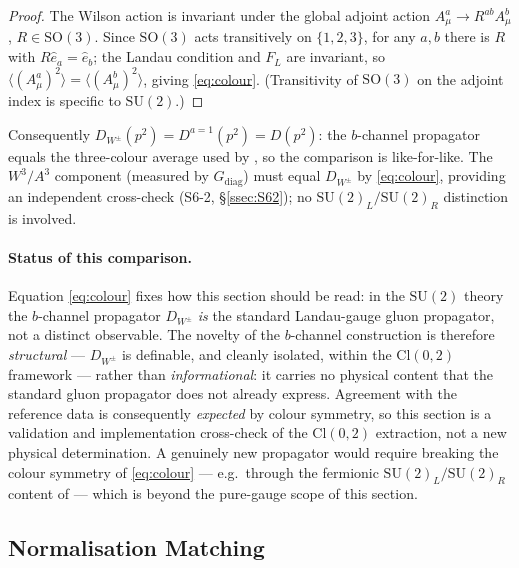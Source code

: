 \documentclass[11pt,a4paper]{article}
\theoremstyle{plain}
\theoremstyle{definition}
\theoremstyle{remark}
\newcommand{\Cl}{\mathrm{Cl}}
\newcommand{\SU}{\mathrm{SU}}
\newcommand{\SO}{\mathrm{SO}}
\newcommand{\Gdiag}{G_{\mathrm{diag}}}
\newcommand{\DW}{D_{W^{\pm}}}
\newcommand{\FL}{F_{L}}
\begin{document}
\begin{proof}
The Wilson action is invariant under the global adjoint action
$A^a_\mu\to R^{ab}A^b_\mu$, $R\in\SO(3)$. Since $\SO(3)$ acts
transitively on $\{1,2,3\}$, for any $a,b$ there is $R$ with
$R\hat e_a=\hat e_b$; the Landau condition and $\FL$ are invariant, so
$\langle(A^a_\mu)^2\rangle=\langle(A^b_\mu)^2\rangle$, giving
\eqref{eq:colour}. (Transitivity of $\SO(3)$ on the adjoint index is
specific to $\SU(2)$.)
\end{proof}

\noindent
Consequently $\DW(p^2)=D^{a=1}(p^2)=D(p^2)$: the $b$-channel propagator
equals the three-colour average used by \cite{CM}, so the comparison is
like-for-like. The $W^3/A^3$ component (measured by $\Gdiag$) must equal
$\DW$ by \eqref{eq:colour}, providing an independent cross-check
(S6-2, \S\ref{ssec:S62}); no $\SU(2)_L/\SU(2)_R$ distinction is involved.

\paragraph{Status of this comparison.}
Equation \eqref{eq:colour} fixes how this section should be read: in the
$\SU(2)$ theory the $b$-channel propagator $\DW$ \emph{is} the standard
Landau-gauge gluon propagator, not a distinct observable. The novelty of
the $b$-channel construction is therefore \emph{structural} --- $\DW$ is
definable, and cleanly isolated, within the $\Cl(0,2)$ framework --- rather
than \emph{informational}: it carries no physical content that the standard
gluon propagator does not already express. Agreement with the reference
data is consequently \emph{expected} by colour symmetry, so this section is
a validation and implementation cross-check of the $\Cl(0,2)$ extraction,
not a new physical determination. A genuinely new propagator would require
breaking the colour symmetry of \eqref{eq:colour} --- e.g.\ through the
fermionic $\SU(2)_L/\SU(2)_R$ content of  --- which is
beyond the pure-gauge scope of this section.

\subsection{Normalisation Matching}
\label{ssec:norm}
\end{document}
